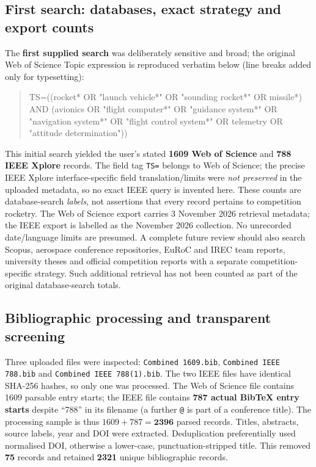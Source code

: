 \documentclass[10pt,a4paper]{article}
\begin{document}
\subsection{First search: databases, exact strategy and export counts}
The \textbf{first supplied search} was deliberately sensitive and broad; the original Web of Science Topic expression is reproduced verbatim below (line breaks added only for typesetting):
\begin{quote}\small\ttfamily
TS=((rocket* OR "launch vehicle*" OR "sounding rocket*" OR missile*)\newline
AND (avionics OR "flight computer*" OR "guidance system*"\newline
OR "navigation system*" OR "flight control system*"\newline
OR telemetry OR "attitude determination"))
\end{quote}
This initial search yielded the user's stated \textbf{1609 Web of Science} and \textbf{788 IEEE Xplore} records. The field tag \texttt{TS=} belongs to Web of Science; the precise IEEE Xplore interface-specific field translation/limits were \emph{not preserved} in the uploaded metadata, so no exact IEEE query is invented here. These counts are database-search \emph{labels}, not assertions that every record pertains to competition rocketry. The Web of Science export carries 3 November 2026 retrieval metadata; the IEEE export is labelled as the November 2026 collection. No unrecorded date/language limits are presumed. A complete future review should also search Scopus, aerospace conference repositories, EuRoC and IREC team reports, university theses and official competition reports with a separate competition-specific strategy. Such additional retrieval has not been counted as part of the original database-search totals.

\subsection{Bibliographic processing and transparent screening}
Three uploaded files were inspected: \texttt{Combined 1609.bib}, \texttt{Combined IEEE 788.bib} and \texttt{Combined IEEE 788(1).bib}. The two IEEE files have identical SHA-256 hashes, so only one was processed. The Web of Science file contains 1609 parsable entry starts; the IEEE file contains \textbf{787 actual BibTeX entry starts} despite ``788'' in its filename (a further \texttt{@} is part of a conference title). The processing sample is thus $1609+787=\mathbf{2396}$ parsed records. Titles, abstracts, source labels, year and DOI were extracted. Deduplication preferentially used normalised DOI, otherwise a lower-case, punctuation-stripped title. This removed \textbf{75} records and retained \textbf{2321} unique bibliographic records.
\end{document}
